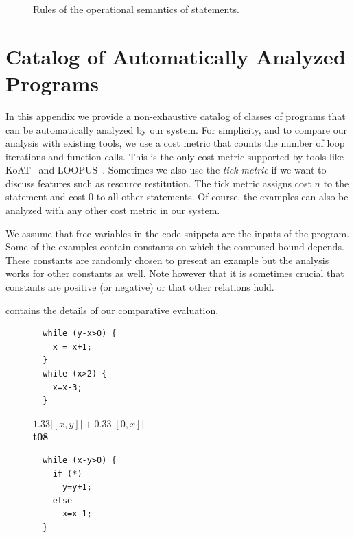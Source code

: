 \documentclass[nocopyrightspace,preprint,pldi]{sigplanconf-pldi15}
\newcommand{\pref}[1]{\prettyref{#1}}
\begin{document}
{\begin{figure}[t!]
\begin{mathpar}
\end{mathpar}
\caption{Rules of the operational semantics of statements.}
\label{fig:opsem}
\end{figure}



\section{Catalog of Automatically Analyzed Programs}
\label{app:cat}

In this appendix we provide a non-exhaustive catalog of classes of
programs that can be automatically analyzed by our system.  For
simplicity, and to compare our analysis with existing tools, we use a
cost metric that counts the number of loop iterations and function
calls.  This is the only cost metric supported by tools like
KoAT~\cite{BrockschmidtEFFG14} and LOOPUS~\cite{SinnZV14}.  Sometimes
we also use the \emph{tick metric} if we want to discuss features such as
resource restitution.  The tick metric assigns cost $n$ to the
statement  and cost $0$ to all other statements. Of
course, the examples can also be analyzed with any other cost metric
in our system.

We assume that free variables in the code snippets are the inputs of
the program. Some of the examples contain constants on which the
computed bound depends.  These constants are randomly chosen to
present an example but the analysis works for other constants as well.
Note however that it is sometimes crucial that constants are positive
(or negative) or that other relations hold.

\pref{tab:eval} contains the details of our comparative evaluation.


\begin{figure}
\setlength{\progwidth}{.24\linewidth}
  \centering

  \begin{minipage}[b]{\progwidth}
    \begin{center}
   \begin{lstlisting}
  while (y-x>0) {
    x = x+1;
  }
  while (x>2) {
    x=x-3;
  }
   \end{lstlisting}

$1.33|[x,y]| + 0.33|[0,x]|$
\\[.7\baselineskip]
      {\bf t08}
    \end{center}
  \end{minipage}
%
%
%
  \begin{minipage}[b]{\progwidth}
    \begin{center}
   \begin{lstlisting}
  while (x-y>0) {
    if (*)
      y=y+1;
    else
      x=x-1;
  }
   \end{lstlisting}


\end{center}
\end{minipage}
\end{figure}}
\end{document}

